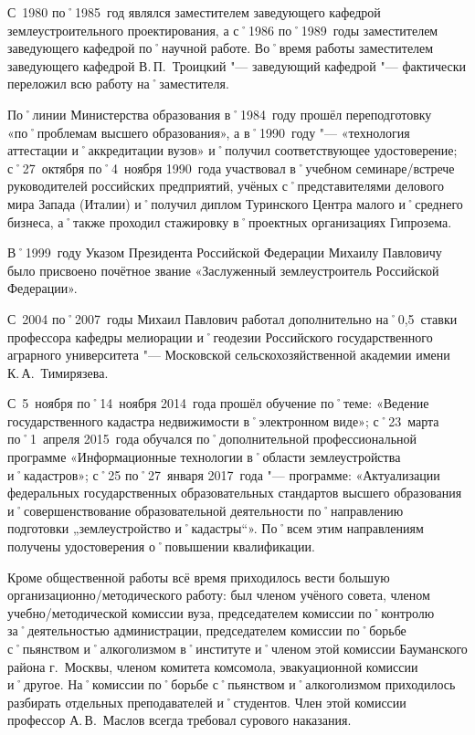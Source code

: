 С~1980 по˚1985~год являлся заместителем заведующего кафедрой землеустроительного проектирования, а с˚1986 по˚1989~годы заместителем заведующего кафедрой по˚научной работе. Во˚время работы заместителем заведующего кафедрой В.\,П.~Троицкий "--- заведующий кафедрой "--- фактически переложил всю работу на˚заместителя.

По˚линии Министерства образования в˚1984~году прошёл переподготовку «по˚проблемам высшего образования», а в˚1990~году "--- «технология аттестации и˚аккредитации вузов» и˚получил соответствующее удостоверение; с˚27~октября по˚4~ноября 1990~года участвовал в˚учебном семинаре\-/встрече руководителей российских предприятий, учёных с˚представителями делового мира Запада (Италии) и˚получил диплом Туринского Центра малого и˚среднего бизнеса, а˚также проходил стажировку в˚проектных организациях Гипрозема.

В˚1999~году Указом Президента Российской Федерации Михаилу Павловичу было присвоено  почётное звание «Заслуженный землеустроитель Российской Федерации». 

С~2004 по˚2007~годы Михаил Павлович работал дополнительно на˚0,5~ставки профессора кафедры мелиорации и˚геодезии Российского государственного аграрного университета "--- Московской сельскохозяйственной академии имени К.\,А.~Тимирязева.

С~5~ноября по˚14~ноября 2014~года прошёл обучение по˚теме: «Ведение государственного кадастра недвижимости в˚электронном виде»; с˚23~марта по˚1~апреля 2015~года обучался по˚дополнительной профессиональной программе «Информационные технологии в˚области землеустройства и˚кадастров»; с˚25 по˚27~января 2017~года "--- программе: «Актуализации федеральных государственных образовательных стандартов высшего образования и˚совершенствование образовательной деятельности по˚направлению подготовки „землеустройство и˚кадастры“». По˚всем этим направлениям получены удостоверения о˚повышении квалификации. 

Кроме общественной работы всё время приходилось вести большую организационно\-/методического работу: был членом учёного совета, членом учебно\-/методической комиссии вуза, председателем комиссии по˚контролю за˚деятельностью администрации, председателем комиссии по˚борьбе с˚пьянством и˚алкоголизмом в˚институте и˚членом этой комиссии Бауманского района г.~Москвы, членом комитета комсомола, эвакуационной комиссии и˚другое. На˚комиссии по˚борьбе с˚пьянством и˚алкоголизмом приходилось разбирать отдельных преподавателей и˚студентов. Член этой комиссии профессор А.\,В.~Маслов всегда требовал сурового наказания.
